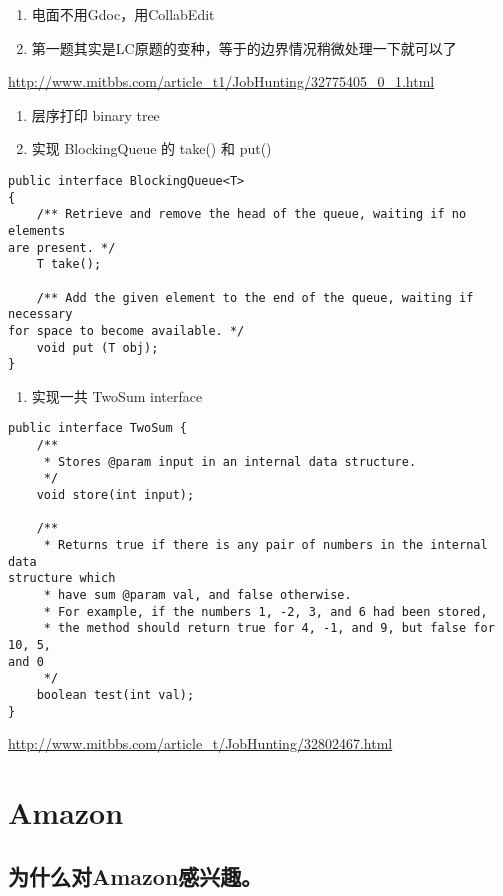 \documentclass[12pt]{book}
\begin{document}
\begin{enumerate}
\item 电面不用Gdoc，用CollabEdit

\item 第一题其实是LC原题的变种，等于的边界情况稍微处理一下就可以了
\end{enumerate}

\url{http://www.mitbbs.com/article_t1/JobHunting/32775405_0_1.html}

\begin{enumerate}
\item 层序打印 binary tree

\item 实现 BlockingQueue 的 take() 和 put()
\end{enumerate}
\lstset{language=java,label= ,caption= ,numbers=none}
\begin{lstlisting}
public interface BlockingQueue<T>
{
    /** Retrieve and remove the head of the queue, waiting if no elements 
are present. */
    T take();

    /** Add the given element to the end of the queue, waiting if necessary 
for space to become available. */
    void put (T obj);
}
\end{lstlisting}

\begin{enumerate}
\item 实现一共 TwoSum interface
\end{enumerate}
\lstset{language=java,label= ,caption= ,numbers=none}
\begin{lstlisting}
public interface TwoSum {
    /**
     * Stores @param input in an internal data structure.
     */
    void store(int input);

    /**
     * Returns true if there is any pair of numbers in the internal data 
structure which
     * have sum @param val, and false otherwise.
     * For example, if the numbers 1, -2, 3, and 6 had been stored,
     * the method should return true for 4, -1, and 9, but false for 10, 5, 
and 0
     */
    boolean test(int val);
}
\end{lstlisting}
\url{http://www.mitbbs.com/article_t/JobHunting/32802467.html}

\chapter{Amazon}
\label{sec-25}
\section{为什么对Amazon感兴趣。}
\label{sec-25-1}
\end{document}
